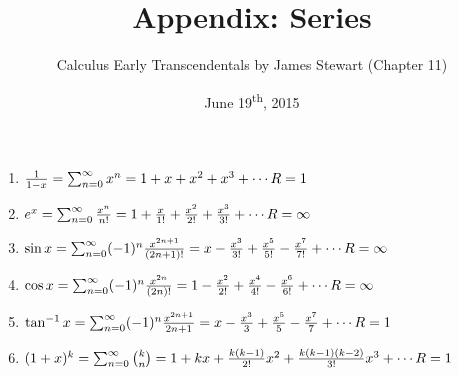\documentclass[a4paper,8pt]{article}
\title{Appendix: Series}
\author{Calculus Early Transcendentals by James Stewart (Chapter 11)}
\date{June 19\textsuperscript{th}, 2015}
\begin{document}
\maketitle
{}

\begin{outline}

    \begin{enumerate}
      \item \(\frac{1}{1-x} = \sum_{n=0}^{\infty}x^n = 1 + x + x^2 + x^3 + \cdots \hfill R = 1\)
      \item \(e^x = \sum_{n=0}^{\infty} \frac{x^n}{n!} = 1 + \frac{x}{1!} + \frac{x^2}{2!} + \frac{x^3}{3!} + \cdots \hfill R = \infty\)
      \item \(\sin{x} = \sum_{n=0}^{\infty} (-1)^n\frac{x^{2n+1}}{(2n+1)!} = x - \frac{x^3}{3!} + \frac{x^5}{5!} - \frac{x^7}{7!} + \cdots \hfill R = \infty\)
      \item \(\cos{x} = \sum_{n=0}^{\infty} (-1)^n\frac{x^{2n}}{(2n)!} = 1 - \frac{x^2}{2!} + \frac{x^4}{4!} - \frac{x^6}{6!} + \cdots \hfill R = \infty\)
      \item \(\tan^{-1}x = \sum_{n=0}^{\infty} (-1)^n \frac{x^{2n+1}}{2n+1} = x - \frac{x^3}{3} + \frac{x^5}{5} - \frac{x^7}{7} + \cdots \hfill R = 1\)
      \item \((1+x)^k = \sum_{n=0}^{\infty} \binom{k}{n} = 1 + kx + \frac{k(k-1)}{2!}x^2 + \frac{k(k-1)(k-2)}{3!}x^3 + \cdots \hfill R = 1\)
    \end{enumerate}

\end{outline}
\end{document}
